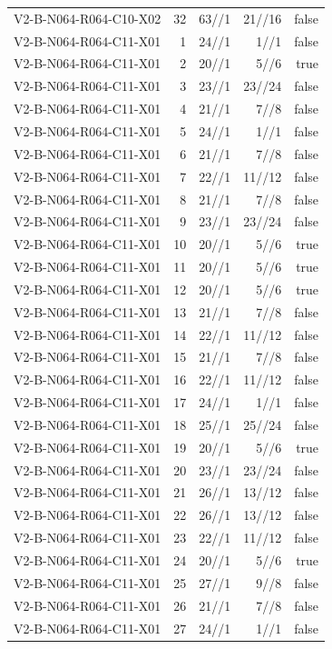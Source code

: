 {\begin{longtable}{lrrrr}
V2-B-N064-R064-C10-X02 & 32 & 63//1 & 21//16 & false \\
V2-B-N064-R064-C11-X01 & 1 & 24//1 & 1//1 & false \\
V2-B-N064-R064-C11-X01 & 2 & 20//1 & 5//6 & true \\
V2-B-N064-R064-C11-X01 & 3 & 23//1 & 23//24 & false \\
V2-B-N064-R064-C11-X01 & 4 & 21//1 & 7//8 & false \\
V2-B-N064-R064-C11-X01 & 5 & 24//1 & 1//1 & false \\
V2-B-N064-R064-C11-X01 & 6 & 21//1 & 7//8 & false \\
V2-B-N064-R064-C11-X01 & 7 & 22//1 & 11//12 & false \\
V2-B-N064-R064-C11-X01 & 8 & 21//1 & 7//8 & false \\
V2-B-N064-R064-C11-X01 & 9 & 23//1 & 23//24 & false \\
V2-B-N064-R064-C11-X01 & 10 & 20//1 & 5//6 & true \\
V2-B-N064-R064-C11-X01 & 11 & 20//1 & 5//6 & true \\
V2-B-N064-R064-C11-X01 & 12 & 20//1 & 5//6 & true \\
V2-B-N064-R064-C11-X01 & 13 & 21//1 & 7//8 & false \\
V2-B-N064-R064-C11-X01 & 14 & 22//1 & 11//12 & false \\
V2-B-N064-R064-C11-X01 & 15 & 21//1 & 7//8 & false \\
V2-B-N064-R064-C11-X01 & 16 & 22//1 & 11//12 & false \\
V2-B-N064-R064-C11-X01 & 17 & 24//1 & 1//1 & false \\
V2-B-N064-R064-C11-X01 & 18 & 25//1 & 25//24 & false \\
V2-B-N064-R064-C11-X01 & 19 & 20//1 & 5//6 & true \\
V2-B-N064-R064-C11-X01 & 20 & 23//1 & 23//24 & false \\
V2-B-N064-R064-C11-X01 & 21 & 26//1 & 13//12 & false \\
V2-B-N064-R064-C11-X01 & 22 & 26//1 & 13//12 & false \\
V2-B-N064-R064-C11-X01 & 23 & 22//1 & 11//12 & false \\
V2-B-N064-R064-C11-X01 & 24 & 20//1 & 5//6 & true \\
V2-B-N064-R064-C11-X01 & 25 & 27//1 & 9//8 & false \\
V2-B-N064-R064-C11-X01 & 26 & 21//1 & 7//8 & false \\
V2-B-N064-R064-C11-X01 & 27 & 24//1 & 1//1 & false \\

\end{longtable}}
